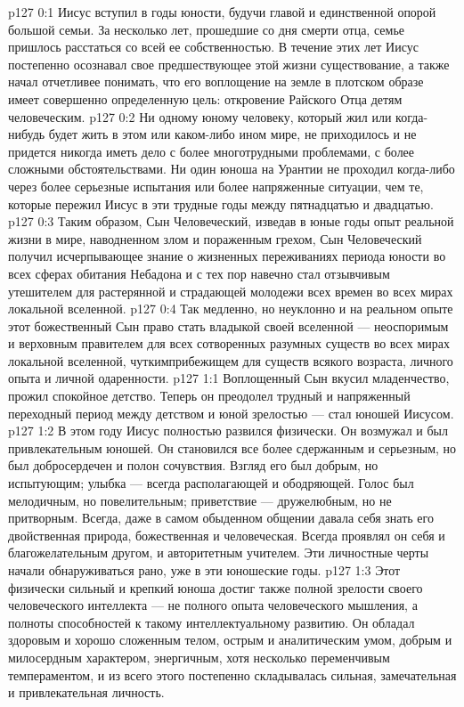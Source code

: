 \vs p127 0:1 Иисус вступил в годы юности, будучи главой и единственной опорой большой семьи. За несколько лет, прошедшие со дня смерти отца, семье пришлось расстаться со всей ее собственностью. В течение этих лет Иисус постепенно осознавал свое предшествующее этой жизни существование, а также начал отчетливее понимать, что его воплощение на земле в плотском образе имеет совершенно определенную цель: откровение Райского Отца детям человеческим.
\vs p127 0:2 Ни одному юному человеку, который жил или когда\hyp{}нибудь будет жить в этом или каком\hyp{}либо ином мире, не приходилось и не придется никогда иметь дело с более многотрудными проблемами, с более сложными обстоятельствами. Ни один юноша на Урантии не проходил когда\hyp{}либо через более серьезные испытания или более напряженные ситуации, чем те, которые пережил Иисус в эти трудные годы между пятнадцатью и двадцатью.
\vs p127 0:3 Таким образом, Сын Человеческий, изведав в юные годы опыт реальной жизни в мире, наводненном злом и пораженным грехом, Сын Человеческий получил исчерпывающее знание о жизненных переживаниях периода юности во всех сферах обитания Небадона и с тех пор навечно стал отзывчивым утешителем для растерянной и страдающей молодежи всех времен во всех мирах локальной вселенной.
\vs p127 0:4 Так медленно, но неуклонно и на реальном опыте этот божественный Сын  право стать владыкой своей вселенной --- неоспоримым и верховным правителем для всех сотворенных разумных существ во всех мирах локальной вселенной, чуткимприбежищем для существ всякого возраста, личного опыта и личной одаренности.
\vs p127 1:1 Воплощенный Сын вкусил младенчество, прожил спокойное детство. Теперь он преодолел трудный и напряженный переходный период между детством и юной зрелостью --- стал юношей Иисусом.
\vs p127 1:2 В этом году Иисус полностью развился физически. Он возмужал и был привлекательным юношей. Он становился все более сдержанным и серьезным, но был добросердечен и полон сочувствия. Взгляд его был добрым, но испытующим; улыбка --- всегда располагающей и ободряющей. Голос был мелодичным, но повелительным; приветствие --- дружелюбным, но не притворным. Всегда, даже в самом обыденном общении давала себя знать его двойственная природа, божественная и человеческая. Всегда проявлял он себя и благожелательным другом, и авторитетным учителем. Эти личностные черты начали обнаруживаться рано, уже в эти юношеские годы.
\vs p127 1:3 Этот физически сильный и крепкий юноша достиг также полной зрелости своего человеческого интеллекта --- не полного опыта человеческого мышления, а полноты способностей к такому интеллектуальному развитию. Он обладал здоровым и хорошо сложенным телом, острым и аналитическим умом, добрым и милосердным характером, энергичным, хотя несколько переменчивым темпераментом, и из всего этого постепенно складывалась сильная, замечательная и привлекательная личность.
